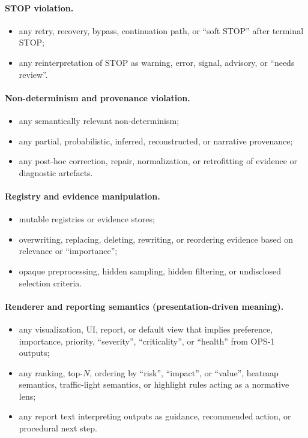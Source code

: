 \paragraph{STOP violation.}
\begin{itemize}
  \item any retry, recovery,
        bypass, continuation path,
        or ``soft STOP''
        after terminal STOP;
  \item any reinterpretation of STOP
        as warning, error,
        signal, advisory,
        or ``needs review''.
\end{itemize}

\paragraph{Non-determinism and provenance violation.}
\begin{itemize}
  \item any semantically relevant
        non-determinism;
  \item any partial, probabilistic,
        inferred, reconstructed,
        or narrative provenance;
  \item any post-hoc correction,
        repair, normalization,
        or retrofitting of evidence
        or diagnostic artefacts.
\end{itemize}

\paragraph{Registry and evidence manipulation.}
\begin{itemize}
  \item mutable registries
        or evidence stores;
  \item overwriting, replacing,
        deleting, rewriting,
        or reordering evidence
        based on relevance
        or ``importance'';
  \item opaque preprocessing,
        hidden sampling,
        hidden filtering,
        or undisclosed
        selection criteria.
\end{itemize}

\paragraph{Renderer and reporting semantics (presentation-driven meaning).}
\begin{itemize}
  \item any visualization, UI,
        report, or default view
        that implies preference,
        importance, priority,
        ``severity'',
        ``criticality'',
        or ``health''
        from OPS-1 outputs;
  \item any ranking, top-$N$,
        ordering by ``risk'',
        ``impact'',
        or ``value'',
        heatmap semantics,
        traffic-light semantics,
        or highlight rules
        acting as a normative lens;
  \item any report text
        interpreting outputs
        as guidance,
        recommended action,
        or procedural next step.
\end{itemize}

